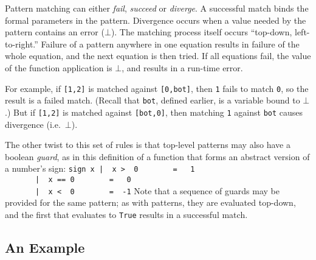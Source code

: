 Pattern matching can either {\em fail}, {\em succeed}  or {\em
diverge}.  A successful match binds the formal parameters in the
pattern.  Divergence occurs when a value needed by the pattern
contains an error ($\bot$).  The matching process itself occurs ``top-down,
left-to-right.''  Failure of a pattern anywhere in one equation
results in failure of the whole equation, and the next equation is
then tried.  If all equations fail, the value of the function
application is $\bot$, and results in a run-time error.

For example, if \mbox{\tt [1,2]} is matched against \mbox{\tt [0,bot]}, then \mbox{\tt 1} fails
to match \mbox{\tt 0}, so the result is a failed match.  (Recall that \mbox{\tt bot},
defined earlier, is a variable bound to $\bot$.)  But if \mbox{\tt [1,2]} is
matched against \mbox{\tt [bot,0]}, then matching \mbox{\tt 1} against \mbox{\tt bot} causes
divergence (i.e.~$\bot$).

The other twist to this set of rules is that top-level patterns
may also have a boolean {\em guard}, as in this definition of a
function that forms an abstract version of a number's sign:
\bprog
\mbox{\tt sign\ x\ |\ \ x\ >\ \ 0\ \ \ \ \ \ \ \ =\ \ \ 1}\\
\mbox{\tt \ \ \ \ \ \ \ |\ \ x\ ==\ 0\ \ \ \ \ \ \ \ =\ \ \ 0}\\
\mbox{\tt \ \ \ \ \ \ \ |\ \ x\ <\ \ 0\ \ \ \ \ \ \ \ =\ \ -1}
\eprog 
Note that a sequence of guards may be provided for the same pattern;
as with patterns, they are evaluated top-down, and the first that
evaluates to \mbox{\tt True} results in a successful match.

\subsection{An Example}

